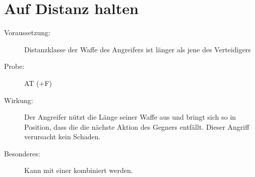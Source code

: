 \section{Auf Distanz halten}
\label{aktion.auf_distanz_halten}
\begin{description}
    \item[Voraussetzung:]
        Distanzklasse der Waffe des Angreifers ist länger als jene des Verteidigers
    \item[Probe:]
        AT (+F)
    \item[Wirkung:]
        Der Angreifer nützt die Länge seiner Waffe aus und bringt sich so in Position, dass die die nächste Aktion des Gegners entfällt.
        Dieser Angriff verursacht kein Schaden.
    \item[Besonderes:]
        Kann mit einer  kombiniert werden.
\end{description}
